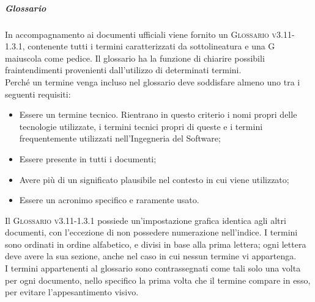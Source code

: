 \documentclass[../norme-di-progetto.tex]{subfiles}
\begin{document}
\subparagraph*{Glossario}
In accompagnamento ai documenti ufficiali viene fornito un \textsc{Glossario v3.11-1.3.1}, contenente tutti i termini caratterizzati da sottolineatura e una G maiuscola come pedice. Il glossario ha la funzione di chiarire possibili fraintendimenti provenienti dall'utilizzo di determinati termini. \\
Perché un termine venga incluso nel glossario deve soddisfare almeno uno tra i seguenti requisiti:
\begin{itemize}
  \item Essere un termine tecnico. Rientrano in questo criterio i nomi propri delle tecnologie utilizzate, i termini tecnici propri di queste e i termini frequentemente utilizzati nell'Ingegneria del Software;
  \item Essere presente in tutti i documenti;
  \item Avere più di un significato plausibile nel contesto in cui viene utilizzato;
  \item Essere un acronimo specifico e raramente usato.
\end{itemize}
Il \textsc{Glossario v3.11-1.3.1} possiede un'impostazione grafica identica agli altri documenti, con l'eccezione di non possedere numerazione nell'indice. I termini sono ordinati in ordine alfabetico, e divisi in base alla prima lettera; ogni lettera deve avere la sua sezione, anche nel caso in cui nessun termine vi appartenga. \\
I termini appartenenti al glossario sono contrassegnati come tali solo una volta per ogni documento, nello specifico la prima volta che il termine compare in esso, per evitare l'appesantimento visivo.
\end{document}
